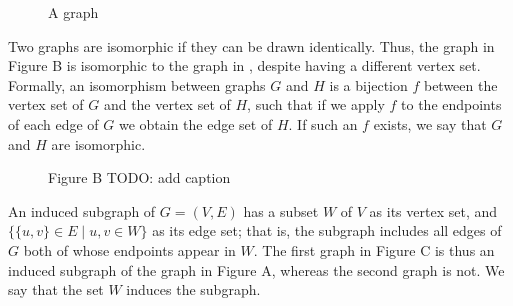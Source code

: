 \begin{figure}[h!]
\centering
{}
\caption{A graph}
\label{fig:introA}
\end{figure}

Two graphs are isomorphic if they can be drawn identically. Thus, the graph in
Figure B is isomorphic to the graph in , despite having a different
vertex set. Formally, an isomorphism between graphs $G$ and $H$ is a bijection $f$
between the vertex set of $G$ and the vertex set of $H$, such that if we apply $f$ to
the endpoints of each edge of $G$ we obtain the edge set of $H$. If such an $f$
exists, we say that $G$ and $H$ are isomorphic.

\begin{figure}[h!]
\centering
{}
\caption{Figure B TODO: add caption}
\end{figure}

An induced subgraph of $G = (V, E)$ has a subset $W$ of $V$ as its vertex set, and
$\{\{u, v\} \in E \mid u, v \in W\}$ as its edge set; that is, the subgraph
includes all edges of $G$ both of whose endpoints appear in $W$.  The first graph
in Figure C is thus an induced subgraph of the graph in Figure A, whereas the
second graph is not. We say that the set $W$ induces the subgraph.

